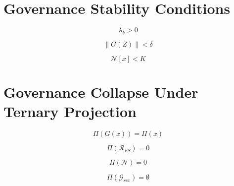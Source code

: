 
\section*{Governance Stability Conditions}

\[
\lambda_k > 0
\]

\[
\|G(Z)\| < \delta
\]

\[
\mathcal{N}[x] < K
\]


\section*{Governance Collapse Under Ternary Projection}

\[
\Pi(G(x)) = \Pi(x)
\]

\[
\Pi(\mathcal{R}_{FS}) = 0
\]

\[
\Pi(\mathcal{N}) = 0
\]

\[
\Pi(\mathcal{G}_{rev}) = \emptyset
\]

